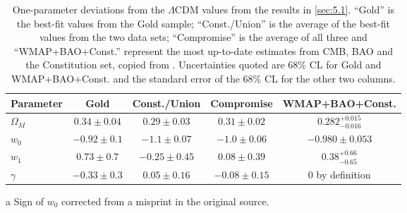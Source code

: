 \begin{table}[htbp]
\centering

\begin{threeparttable}

\caption{One-parameter deviations from the $\Lambda$CDM values from the results in
\cref{sec:5.1}. ``Gold'' is the best-fit values from the Gold sample;
``Const./Union'' is the average of the best-fit values from the two data sets;
``Compromise'' is the average of all three and ``WMAP+BAO+Const.'' represent the
most up-to-date estimates from CMB, BAO and the Constitution set, copied from
\cite{Komatsu2010}. Uncertainties quoted are 68\% CL for Gold and WMAP+BAO+Const.
and the standard error of the 68\% CL for the other two columns.}
\label{tab:5.3}

\begin{tabular}{@{}lcccc@{}}
\toprule
Parameter & Gold\tnote{a} & Const./Union & Compromise & WMAP+BAO+Const. \\
\midrule

$\Omega_M$ &
$0.34 \pm 0.04$ &
$0.29 \pm 0.03$ &
$0.31 \pm 0.02$ &
$0.282^{+0.015}_{-0.016}$ \\

$w_0$ &
$-0.92 \pm 0.1$ &
$-1.1 \pm 0.07$ &
$-1.0 \pm 0.06$ &
$-0.980 \pm 0.053$ \\

$w_1$ &
$0.73 \pm 0.7$ &
$-0.25 \pm 0.45$ &
$0.08 \pm 0.39$ &
$0.38^{+0.66}_{-0.65}$ \\

$\gamma$ &
$-0.33 \pm 0.3$ &
$0.05 \pm 0.16$ &
$-0.08 \pm 0.15$ &
$0$ by definition \\

\bottomrule
\end{tabular}

\begin{tablenotes}
\footnotesize
\item[a] Sign of $w_0$ corrected from a misprint in the original source.
\end{tablenotes}

\end{threeparttable}

\end{table}
